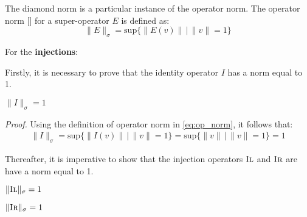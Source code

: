 The diamond norm is a particular instance of the operator norm. The operator norm [\cite{guide2006infinite}] for a super-operator $E$ is defined as:
\begin{equation} \label{eq:op_norm}
  \lVert E \rVert_{\sigma} = \text{sup} \{ \lVert E(v) \rVert \hspace{2pt} | \hspace{2pt} \lVert v \rVert = 1 \}
\end{equation}

\vspace{15pt}

For the \textbf{injections}:

Firstly, it is necessary to prove that the identity operator $I$ has a norm equal to 1.
\begin{lemma} \label{lemid}
  $ \lVert I \rVert_{\sigma} = 1   $
\end{lemma}

\textit{Proof.} \quad Using the definition of operator norm in \autoref{eq:op_norm}, it follows that:
\begin{equation} 
\begin{split}
  \lVert I \rVert_{\sigma} = \text{sup} \{\lVert I (v) \rVert \hspace{2pt} \vert \hspace{2pt}  \lVert v\rVert =1 \} = \text{sup} \{\lVert v \rVert \hspace{2pt} \vert \hspace{2pt}  \lVert v\rVert =1 \} = 1
\end{split}
\end{equation}

\vspace{10pt}

Thereafter, it is imperative to show that the injection operators $\textsc{Il}$ and $\textsc{Ir}$ are have a norm equal to 1.

\begin{lemma} \label{lemil}
  $ \lVert \textsc{Il} \rVert_{\sigma} = 1   $
\end{lemma}

\begin{lemma} \label{lemir}
  $ \lVert \textsc{Ir} \rVert_{\sigma} = 1   $
\end{lemma} 

